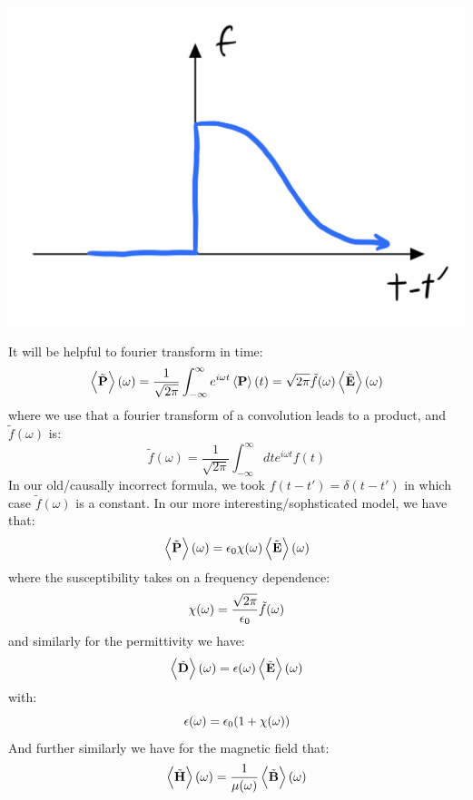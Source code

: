 \begin{center}
    \includegraphics[scale=0.35]{Lectures/Images/lec13-ffunction.png}
\end{center}


It will be helpful to fourier transform in time:
\begin{equation}
    \left< \tilde{\mathbf{P}} \right>(\omega) = \frac{1}{\sqrt{2\pi}}\int_{-\infty}^\infty e^{i\omega t}\left< \mathbf{P} \right>(t) = \sqrt{2\pi}\tilde{f}(\omega)\left< \tilde{\mathbf{E}} \right>(\omega)
\end{equation}
where we use that a fourier transform of a convolution leads to a product, and $\tilde{f}(\omega)$ is:
\begin{equation}\label{eq:fomega}
    \tilde{f}(\omega) = \frac{1}{\sqrt{2\pi}}\int_{-\infty}^\infty dt e^{i\omega t}f(t)
\end{equation}
In our old/causally incorrect formula, we took $f(t - t') = \delta(t - t')$ in which case $\tilde{f}(\omega)$ is a constant. In our more interesting/sophsticated model, we have that:
\begin{equation}
    \left< \tilde{\mathbf{P}} \right>(\omega) = \epsilon_0 \chi(\omega)\left< \tilde{\mathbf{E}} \right>(\omega)
\end{equation}
where the susceptibility takes on a frequency dependence:
\begin{equation}
    \chi(\omega) = \frac{\sqrt{2\pi}}{\epsilon_0}\tilde{f}(\omega)
\end{equation}
and similarly for the permittivity we have:
\begin{equation}
    \left< \tilde{\mathbf{D}} \right>(\omega) = \epsilon(\omega)\left< \tilde{\mathbf{E}} \right>(\omega)
\end{equation}
with:
\begin{equation}
    \epsilon(\omega) = \epsilon_0(1 + \chi(\omega))
\end{equation}
And further similarly we have for the magnetic field that:
\begin{equation}
    \left< \tilde{\mathbf{H}} \right>(\omega) = \frac{1}{\mu(\omega)}\left< \tilde{\mathbf{B}} \right>(\omega)
\end{equation}

